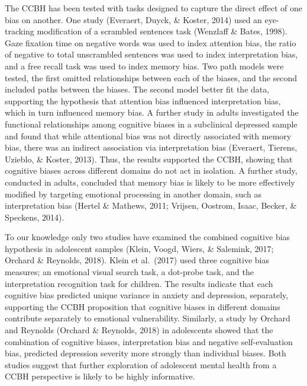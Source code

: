 \documentclass[man,floatsintext]{apa6}
\begin{document}
The CCBH has been tested with tasks designed to capture the direct effect of one bias on another. One study (Everaert, Duyck, \& Koster, 2014) used an eye-tracking modification of a scrambled sentences task (Wenzlaff \& Bates, 1998). Gaze fixation time on negative words was used to index attention bias, the ratio of negative to total unscrambled sentences was used to index interpretation bias, and a free recall task was used to index memory bias. Two path models were tested, the first omitted relationships between each of the biases, and the second included paths between the biases. The second model better fit the data, supporting the hypothesis that attention bias influenced interpretation bias, which in turn influenced memory bias. A further study in adults investigated the functional relationships among cognitive biases in a subclinical depressed sample and found that while attentional bias was not directly associated with memory bias, there was an indirect association via interpretation bias (Everaert, Tierens, Uzieblo, \& Koster, 2013). Thus, the results supported the CCBH, showing that cognitive biases across different domains do not act in isolation. A further study, conducted in adults, concluded that memory bias is likely to be more effectively modified by targeting emotional processing in another domain, such as interpretation bias (Hertel \& Mathews, 2011; Vrijsen, Oostrom, Isaac, Becker, \& Speckens, 2014).

To our knowledge only two studies have examined the combined cognitive bias hypothesis in adolescent samples (Klein, Voogd, Wiers, \& Salemink, 2017; Orchard \& Reynolds, 2018). Klein et al.~(2017) used three cognitive bias measures; an emotional visual search task, a dot-probe task, and the interpretation recognition task for children. The results indicate that each cognitive bias predicted unique variance in anxiety and depression, separately, supporting the CCBH proposition that cognitive biases in different domains contribute separately to emotional vulnerability. Similarly, a study by Orchard and Reynolds (Orchard \& Reynolds, 2018) in adolescents showed that the combination of cognitive biases, interpretation bias and negative self-evaluation bias, predicted depression severity more strongly than individual biases. Both studies suggest that further exploration of adolescent mental health from a CCBH perspective is likely to be highly informative.
\end{document}
